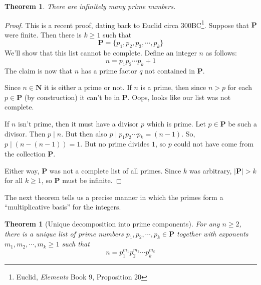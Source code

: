 \documentclass[12pt]{article}
\numberwithin{equation}{subsection}
\newtheorem{thm}[subsection]{Theorem}
\theoremstyle{note}
\begin{document}
\begin{thm} \label{lotta-primes}
	There are infinitely many prime numbers.
\end{thm}

{\begin{proof}
	This is a recent proof, dating back to Euclid circa 300BC\footnote{Euclid, \textit{Elements} Book 9, Proposition 20}. Suppose that $\mathbf{P}$ were finite. Then there is $k\geq 1$ such that \[ \mathbf{P}=\{p_1,p_2,p_3,\cdots,p_k\}\] We'll show that this list cannot be complete. Define an integer $n$ as follows: \[n = p_1p_2\cdots p_k +1\]  The claim is now that $n$ has a prime factor $q$ not contained in $\mathbf{P}$. 
	
	Since $n\in\mathbf{N}$ it is either a prime or not. If $n$ is a prime, then since $n>p$ for each $p\in\mathbf{P}$ (by construction) it can't be in $\mathbf{P}$. Oops, looks like our list was not complete. 
	
	If $n$ isn't prime, then it must have a divisor $p$ which is prime. Let $p\in \mathbf{P}$ be such a divisor. Then $p\mid n$. But then also $p\mid p_1p_2\cdots p_k=(n-1)$. So, $p\mid (n-(n-1))=1$. But no prime divides $1$, so $p$ could not have come from the collection $\mathbf{P}$. 
	
	Either way, $\mathbf{P}$ was not a complete list of all primes. Since $k$ was arbitrary, $| \mathbf{P} |> k$ for all $k\geq 1$, so $\mathbf{P}$ must be infinite. 
\end{proof}}

The next theorem tells us a precise manner in which the primes form a ``multiplicative basis'' for the integers.

\begin{thm}[Unique decomposition into prime components] \label{fta}
	For any $n\geq 2$, there is a unique list of prime numbers $p_1,p_2, \cdots, p_k\in \mathbf{P}$ together with exponents $m_1,m_2, \cdots,m_k\geq 1$ such that \[n=p_1^{m_1}p_2^{m_2}\cdots p_k^{m_k}\]
\end{thm}
\end{document}
